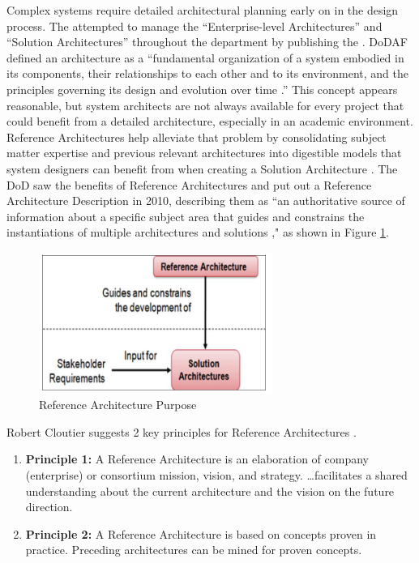 Complex systems require detailed architectural planning early on in the design process. The  attempted to manage the “Enterprise-level Architectures” and “Solution Architectures” throughout the department by publishing the . DoDAF defined an architecture as a “fundamental organization of a system embodied in its components, their relationships to each other and to its environment, and the principles governing its design and evolution over time \citep{DoDAF}.” This concept appears reasonable, but system architects are not always available for every project that could benefit from a detailed architecture, especially in an academic environment. Reference Architectures help alleviate that problem by consolidating subject matter expertise and previous relevant architectures into digestible models that system designers can benefit from when creating a Solution Architecture \citep{Cloutier2010}. The DoD saw the benefits of Reference Architectures and put out a Reference Architecture Description in 2010, describing them as “an authoritative source of information about a  specific subject area that guides and constrains the instantiations of multiple  architectures and solutions \citep{RADescription}," as shown in Figure \ref{fig:Ref Arc Purpose}.

\begin{figure}[!h]
    \centering
    \includegraphics[width=3in]{Thesis/Literature_Review/Lit Review Figures/Ref Arc Purpose.png}
    \caption{Reference Architecture Purpose}
    \label{fig:Ref Arc Purpose}
\end{figure}

Robert Cloutier suggests 2 key principles for Reference Architectures \citep{Cloutier2010}.
\begin{enumerate}
\item{\textbf{Principle 1:} A Reference Architecture is an elaboration of company (enterprise) or consortium mission, vision, and strategy.   …facilitates a shared understanding about the current architecture and the vision on the future direction.}
\item{\textbf{Principle 2:} A Reference Architecture is based on concepts proven in practice. Preceding architectures can be mined for proven concepts.}
\end{enumerate}

